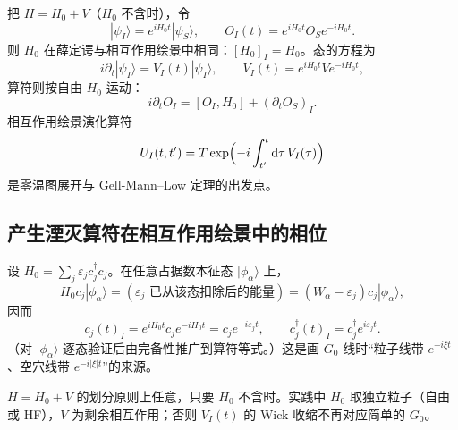 把 $H=H_0+V$（$H_0$ 不含时），令
\begin{equation}
  |\psi_I\rangle
  =e^{iH_0 t}|\psi_S\rangle,
  \qquad
  O_I(t)
  =e^{iH_0 t}O_S e^{-iH_0 t}.
\end{equation}
则 $H_0$ 在薛定谔与相互作用绘景中相同：$[H_0]_I=H_0$。态的方程为
\begin{equation}
  i\partial_t|\psi_I\rangle=V_I(t)|\psi_I\rangle,
  \qquad
  V_I(t)=e^{iH_0 t}V e^{-iH_0 t},
\end{equation}
算符则按自由 $H_0$ 运动：
\begin{equation}
  i\partial_t O_I=[O_I,H_0]+(\partial_t O_S)_I.
\end{equation}
相互作用绘景演化算符
\begin{equation}
  U_I(t,t')
  =T\exp\Bigl(-i\int_{t'}^{t}\mathrm{d}\tau\,V_I(\tau)\Bigr)
\label{eq:UI}
\end{equation}
是零温图展开与 Gell-Mann--Low 定理的出发点。

\subsection{产生湮灭算符在相互作用绘景中的相位}

设 $H_0=\sum_j\varepsilon_j c_j^\dagger c_j$。在任意占据数本征态 $|\phi_\alpha\rangle$ 上，
\begin{equation}
  H_0 c_j|\phi_\alpha\rangle
  =(\varepsilon_j\text{ 已从该态扣除后的能量})
  =(W_\alpha-\varepsilon_j)c_j|\phi_\alpha\rangle,
\end{equation}
因而
\begin{equation}
  c_j(t)_I
  =e^{iH_0 t}c_j e^{-iH_0 t}
  =c_j e^{-i\varepsilon_j t},
  \qquad
  c_j^\dagger(t)_I
  =c_j^\dagger e^{i\varepsilon_j t}.
\label{eq:c_I}
\end{equation}
（对 $|\phi_\alpha\rangle$ 逐态验证后由完备性推广到算符等式。）这是画 $G_0$ 线时“粒子线带 $e^{-i\xi t}$、空穴线带 $e^{-i|\xi|t}$”的来源。

\begin{note}
$H=H_0+V$ 的划分原则上任意，只要 $H_0$ 不含时。实践中 $H_0$ 取独立粒子（自由或 HF），$V$ 为剩余相互作用；否则 $V_I(t)$ 的 Wick 收缩不再对应简单的 $G_0$。
\end{note}
